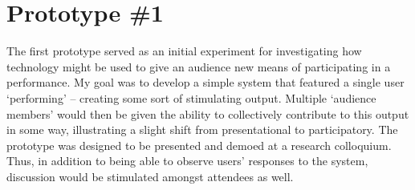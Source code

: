 
\section{Prototype \#1}

The first prototype served as an initial experiment for investigating how technology might be used to give an audience new means of participating in a performance. My goal was to develop a simple system that featured a single user `performing' -- creating some sort of stimulating output. Multiple `audience members' would then be given the ability to collectively contribute to this output in some way, illustrating a slight shift from presentational to participatory. The prototype was designed to be presented and demoed at a research colloquium. Thus, in addition to being able to observe users' responses to the system, discussion would be stimulated amongst attendees as well.

